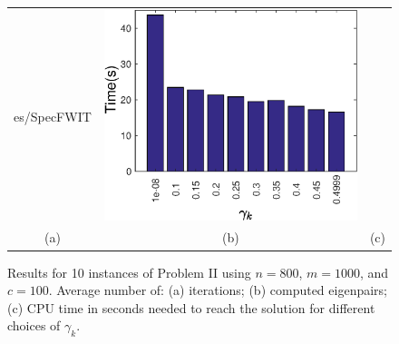 \begin{figure}[H]
\begin{tabular}{ccc}
es/SpecFWIT} & \includegraphics[scale=\myscale]{figures/Spectime} \\
		(a)                                              & (b)                                                & (c)                                                \\
	\end{tabular}
	\caption[Results for 10 instances of Problem II]{Results for 10 instances of Problem II using $n=800$, $m=1000$, and $c=100$. Average number of: (a) iterations; (b) computed eigenpairs; (c)  CPU time in seconds needed to reach the solution for different choices of $\gamma_k$.}
	\label{Spec}
\end{figure}

